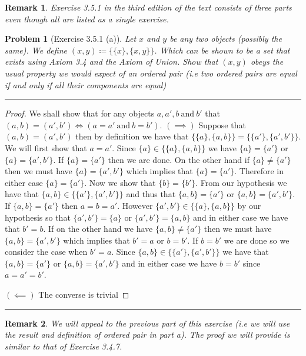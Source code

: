 \documentclass{article}
\newcommand{\lined}{\noindent\rule{\textwidth}{1pt}}
\newtheorem*{problem}{Problem}
\newtheorem*{remark}{Remark}
\begin{document}
	\newpage
	
	\begin{remark}
		Exercise 3.5.1 in the third edition of the text consists of three parts even though all are listed as
		a single exercise.
	\end{remark}

	\begin{problem}[Exercise 3.5.1 (a)]
		Let $x$ and $y$ be any two objects (possibly the same). We define $(x,y) \coloneqq  \{\{x\},\{x,y\}\}$. Which can be shown to be a set that exists using Axiom 3.4 and the Axiom of Union. Show that $(x,y)$ obeys the usual property we would expect of an ordered pair (i.e two ordered pairs are equal if and only if all their components are equal)
	\end{problem}

	\lined
	\begin{proof}
		We shall show that for any objects $a,a',b\ \text{and}\  b'$ that $(a,b) = (a',b') \iff (a = a'\ \text{and}\ b = b')$.
		$(\implies)$ Suppose that $(a,b) = (a',b')$ then by definition we have that $\{\{a\},\{a,b\}\} = \{\{a'\},\{a',b'\}\}$. We will first show that $a = a'$. Since $\{a\} \in \{\{a\},\{a,b\}\}$ we have $\{a\} = \{a'\}$ or $\{a\} = \{a',b'\}$. If $\{a\} = \{a'\}$ then we are done. On the other hand if $\{a\} \neq \{a'\}$ then we must have $\{a\} = \{a',b'\}$ which implies that $\{a\} = \{a'\}$. Therefore in either case $\{a\} = \{a'\}$. Now we show that $\{b\} = \{b'\}$. From our hypothesis we have that $\{a,b\} \in \{\{a'\},\{a',b'\}\}$ and thus that
		$\{a,b\} = \{a'\}$ or $\{a,b\} = \{a',b'\}$. If $\{a,b\} = \{a'\}$ then $a = b = a'$. However $\{a',b'\} \in \{\{a\},\{a,b\}\}$ by our hypothesis so that $\{a',b'\} = \{a\}$ or $\{a',b'\} = \{a,b\}$ and in either case we have that $b' = b$. If on the other hand we have
		$\{a,b\} \neq \{a'\}$ then we must have $\{a,b\} = \{a',b'\}$ which implies that $b' = a$ or $b = b'$. If $b = b'$ we are done so we  consider the case when $b' = a$. Since $\{a,b\} \in \{\{a'\},\{a',b'\}\}$ we have that 
		$\{a,b\} = \{a'\}$ or $\{a,b\} = \{a',b'\}$ and in either case we have $b = b'$ since $a = a' = b'$.
		\linebreak
		
		\noindent $(\impliedby)$ The converse is trivial
	\end{proof}
	\lined
	
	\newpage
	
	\begin{remark}
		We will appeal to the previous part of this exercise (i.e we will use the result and definition of ordered pair in part a). The proof
		we will provide is similar to that of Exercise 3.4.7. 
	\end{remark}
\end{document}
